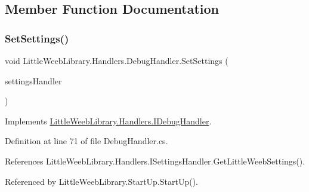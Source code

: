 \subsection{Member Function Documentation}
\mbox{\label{class_little_weeb_library_1_1_handlers_1_1_debug_handler_ac253016968e2d0141b49ab227a715242}} 
\subsubsection{\texorpdfstring{Set\+Settings()}{SetSettings()}}
{\footnotesize\ttfamily void Little\+Weeb\+Library.\+Handlers.\+Debug\+Handler.\+Set\+Settings (\begin{DoxyParamCaption}\item[{\mbox{\hyperlink{interface_little_weeb_library_1_1_handlers_1_1_i_settings_handler}{I\+Settings\+Handler}}}]{settings\+Handler }\end{DoxyParamCaption})}



Implements \mbox{\hyperlink{interface_little_weeb_library_1_1_handlers_1_1_i_debug_handler_ac94e404b87a0922e0d6a7c7a7bc2a1b5}{Little\+Weeb\+Library.\+Handlers.\+I\+Debug\+Handler}}.



Definition at line 71 of file Debug\+Handler.\+cs.



References Little\+Weeb\+Library.\+Handlers.\+I\+Settings\+Handler.\+Get\+Little\+Weeb\+Settings().



Referenced by Little\+Weeb\+Library.\+Start\+Up.\+Start\+Up().



